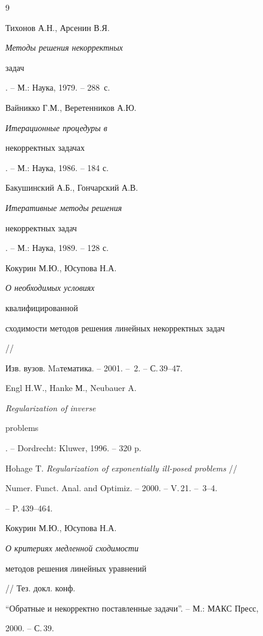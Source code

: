 \begin{thebibliography}{9} 


 


\bibitem{} 


Тихонов А.Н., Арсенин В.Я. {\em Методы решения некорректных 


задач}. -- М.: Наука, 1979. -- 288~с. 


\bibitem{} 


Вайникко Г.М., Веретенников А.Ю. {\em Итерационные процедуры в 


некорректных задачах}. -- М.: Наука, 1986. -- 184 с. 


\bibitem{} 


Бакушинский А.Б., Гончарский А.В. {\em Итеративные методы решения 


некорректных задач}. -- М.: Наука, 1989. -- 128 с. 


\bibitem{} 


Кокурин М.Ю., Юсупова Н.А. {\em О необходимых условиях 


квалифицированной 


сходимости методов решения линейных некорректных задач} // 


Изв. вузов. Maтематика. -- 2001. -- \No\,2. -- С.\,39--47. 


\bibitem{} 


Engl H.W., Hanke М., Neubauer A. {\em Regularization of inverse 


problems}. -- Dordrecht: Kluwer, 1996. -- 320 p. 


\bibitem{} 


Hohage T. {\em Regularization of exponentially ill-posed problems} // 


Numer. Funct. Anal. and Optimiz. -- 2000. -- V.\,21. -- \No\,3--4. 


-- P.\,439--464. 


\bibitem{} 


Кокурин М.Ю., Юсупова Н.А. {\em О критериях медленной сходимости 


методов решения линейных уравнений} // Тез. докл. конф. 


``Обратные и некорректно поставленные задачи''. -- М.: МАКС Пресс, 


2000. -- С.\,39. 


 


\end{thebibliography} 


 


\vskip 2cm 


 






 


\label{end} 


 


